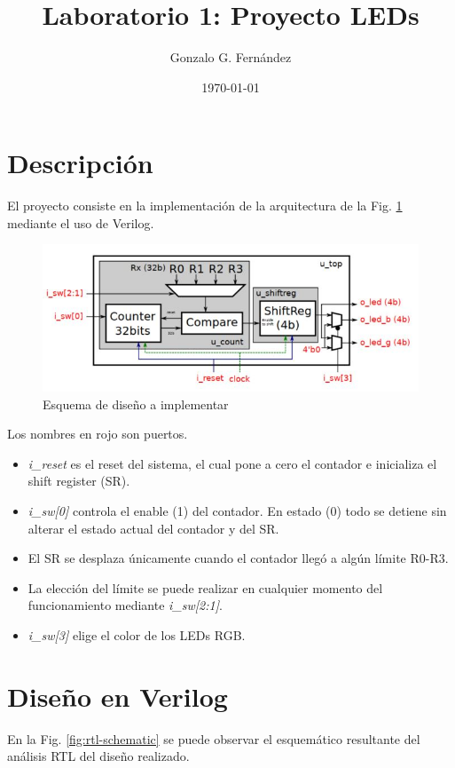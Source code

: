 \documentclass{article}
\title{Laboratorio 1: Proyecto LEDs}
\author{Gonzalo G. Fernández}
\date{\today}
\begin{document}
\maketitle

\section*{Descripción}

El proyecto consiste en la implementación de la arquitectura de la Fig. \ref{fig:scheme} mediante el uso de Verilog.

\begin{figure}[ht]
    \centering
    \includegraphics[]{./scheme.jpg}
    \caption{Esquema de diseño a implementar}
    \label{fig:scheme}
\end{figure}

Los nombres en rojo son puertos.
\begin{itemize}
    \item \textit{i\_reset} es el reset del sistema, el cual pone a cero el contador e inicializa el shift register (SR).
    \item \textit{i\_sw[0]} controla el enable (1) del contador. En estado (0) todo se detiene sin alterar el estado actual del contador y del SR.
    \item El SR se desplaza únicamente cuando el contador llegó a algún límite R0-R3.
    \item La elección del límite se puede realizar en cualquier momento del funcionamiento mediante \textit{i\_sw[2:1]}.
    \item \textit{i\_sw[3]} elige el color de los LEDs RGB.
\end{itemize}

\section*{Diseño en Verilog}

En la Fig. \ref{fig:rtl-schematic} se puede observar el esquemático resultante del análisis RTL del diseño realizado.
\end{document}
